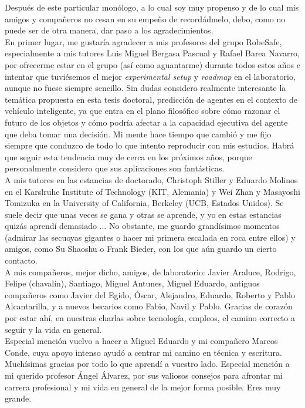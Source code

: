 Después de este particular monólogo, a lo cual soy muy propenso y de lo cual mis amigos y compañeros no cesan en su empeño de recordádmelo, debo, como no puede ser de otra manera, dar paso a los agradecimientos. \\

En primer lugar, me gustaría agradecer a mis profesores del grupo RobeSafe, especialmente a mis tutores Luis Miguel Bergasa Pascual y Rafael Barea Navarro, por ofrecerme estar en el grupo (así como aguantarme) durante todos estos años e intentar que tuviésemos el mejor \textit{experimental setup} y \textit{roadmap} en el laboratorio, aunque no fuese siempre sencillo. Sin dudas considero realmente interesante la temática propuesta en esta tesis doctoral, predicción de agentes en el contexto de vehículo inteligente, ya que entra en el plano filosófico sobre cómo razonar el futuro de los objetos y cómo podría afectar a la capacidad ejecutiva del agente que deba tomar una decisión. Mi mente hace tiempo que cambió y me fijo siempre que conduzco de todo lo que intento reproducir con mis estudios. Habrá que seguir esta tendencia muy de cerca en los próximos años, porque personalmente considero que sus aplicaciones son fantásticas. \\

A mis tutores en las estancias de doctorado, Christoph Stiller y Eduardo Molinos en el Karslruhe Institute of Technology (KIT, Alemania) y Wei Zhan y Masayoshi Tomizuka en la University of California, Berkeley (UCB, Estados Unidos). Se suele decir que unas veces se gana y otras se aprende, y yo en estas estancias quizás aprendí demasiado ... No obstante, me guardo grandísimos momentos (admirar las secuoyas gigantes o hacer mi primera escalada en roca entre ellos) y amigos, como Su Shaoshu o Frank Bieder, con los que aún guardo un cierto contacto. \\

A mis compañeros, mejor dicho, amigos, de laboratorio: Javier Araluce, Rodrigo, Felipe (chavalín), Santiago, Miguel Antunes, Miguel Eduardo,
antiguos compañeros como Javier del Egido, Óscar, Alejandro, Eduardo, Roberto y Pablo Alcantarilla, y a nuevos becarios como Fabio, Navil y Pablo. Gracias de corazón por estar ahí, en nuestras charlas sobre tecnología, empleos, el camino correcto a seguir y la vida en general. \\

Especial mención vuelvo a hacer a Miguel Eduardo y mi compañero Marcos Conde, cuya apoyo intenso ayudó a centrar mi camino en técnica y escritura. Muchísimas gracias por todo lo que aprendí a vuestro lado. Especial mención a mi querido profesor Ángel Álvarez, por sus valiosos consejos para afrontar mi carrera profesional y mi vida en general de la mejor forma posible. Eres muy grande. \\

